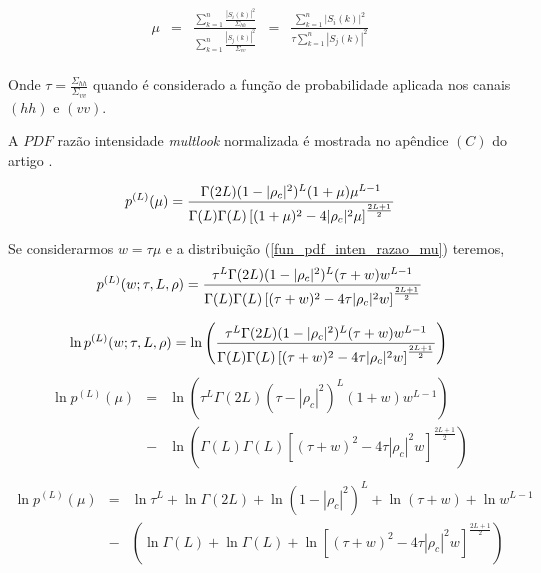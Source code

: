 \documentclass[remotesensing,article,submit,moreauthors,pdftex]{Definitions/mdpi}
\begin{document}
\begin{equation}\label{razao_mu}
\begin{array}{ccccccc}
	\mu&=&\frac{\sum_{k=1}^{n}\frac{|S_i(k)|^2}{\Sigma_{hh}}}{\sum_{k=1}^{n}\frac{|S_j(k)|^2}{\Sigma_{vv}}}&=&\frac{\sum_{k=1}^{n}|S_i(k)|^2}{\tau\sum_{k=1}^{n}|S_j(k)|^2}\\
\end{array}
\end{equation}

Onde $\tau=\frac{\Sigma_{hh}}{\Sigma_{vv}}$ quando é considerado a função de probabilidade aplicada nos canais $(hh)$ e $(vv)$.

A $PDF$ razão intensidade {\it multlook} normalizada é mostrada no apêndice $(C)$ do artigo \cite{lee}.  


\begin{equation}\label{fun_pdf_inten_razao_mu}
	p^{(L)}(\mu)=\frac{\Gamma(2L)(1-|\rho_c|^2)^{L}(1+\mu)\mu^{L-1}}{\Gamma(L)\Gamma(L)\left[(1+\mu)^2-4|\rho_c|^2\mu \right]^{\frac{2L+1}{2}}}\\
\end{equation}

 Se considerarmos $w=\tau \mu$  e a distribuição  (\ref{fun_pdf_inten_razao_mu}) teremos,
\begin{equation}\label{fun_pdf_inten_razao_w}
	p^{(L)}(w;\tau, L, \rho)=\frac{\tau^L\Gamma(2L)(1-|\rho_c|^2)^{L}(\tau+w)w^{L-1}}{\Gamma(L)\Gamma(L)\left[(\tau+w)^2-4\tau|\rho_c|^2w \right]^{\frac{2L+1}{2}}}\\
\end{equation}

\begin{equation}\nonumber
	\ln p^{(L)}(w;\tau, L, \rho)=\ln\left(\frac{\tau^L\Gamma(2L)(1-|\rho_c|^2)^{L}(\tau+w)w^{L-1}}{\Gamma(L)\Gamma(L)\left[(\tau+w)^2-4\tau|\rho_c|^2w \right]^{\frac{2L+1}{2}}}\right)\\
\end{equation}
\begin{equation}\nonumber
\begin{array}{ccc}
	\ln p^{(L)}(\mu)&=&\ln\left(\tau^L\Gamma(2L)(\tau-|\rho_c|^2)^{L}(1+w)w^{L-1}\right)\\
	&-&\ln\left(\Gamma(L)\Gamma(L)\left[(\tau+w)^2-4\tau|\rho_c|^2w \right]^{\frac{2L+1}{2}}\right)\\
\end{array}
\end{equation}
\begin{equation}\nonumber
\begin{array}{ccc}
	\ln p^{(L)}(\mu)&=&\ln\tau^L+\ln\Gamma(2L) +\ln(1-|\rho_c|^2)^{L}+\ln(\tau+w)+\ln w^{L-1}\\
	&-&\left(\ln\Gamma(L)+\ln\Gamma(L)+\ln\left[(\tau+w)^2-4\tau|\rho_c|^2w \right]^{\frac{2L+1}{2}}\right)\\
\end{array}
\end{equation}
\end{document}
